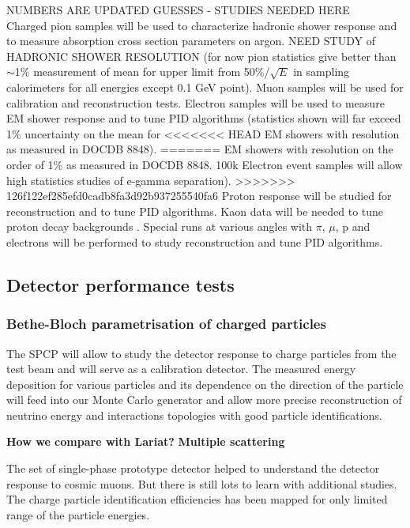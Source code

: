 NUMBERS ARE UPDATED GUESSES - STUDIES NEEDED HERE \\
Charged pion samples will be used to characterize hadronic shower response and to measure
absorption cross section parameters on argon. NEED STUDY of HADRONIC SHOWER RESOLUTION
(for now pion statistics give better than $\sim$1\% measurement of mean for upper limit from 50\%/$\sqrt{E}$ in sampling calorimeters
for all energies except 0.1 GeV point). 
Muon samples will be used for calibration and 
reconstruction tests. Electron samples will be used to measure EM shower response  
and to tune PID algorithms (statistics shown will far exceed 1\% uncertainty on the mean for 
<<<<<<< HEAD
EM showers with resolution as measured in DOCDB 8848). 
=======
EM showers with resolution on the order of 1\% as measured in DOCDB 8848. 100k Electron event samples will allow
high statistics studies of e-gamma separation).  
>>>>>>> 126f122ef285efd0cadb8fa3d92b937255540fa6
Proton response will be studied for reconstruction and to tune PID 
algorithms. Kaon data will be needed to tune proton decay backgrounds .
Special runs at various angles with $\pi$, $\mu$, p and electrons will be performed to study reconstruction and tune PID algorithms. 

\subsection{Detector performance tests}

\subsubsection{Bethe-Bloch parametrisation of charged particles}

The SPCP will allow to study the detector response to charge particles from the test beam and will serve as a calibration detector. The measured energy deposition for various particles and its dependence on the direction of the particle will feed into our Monte Carlo generator and allow more precise reconstruction of neutrino energy and interactions topologies with good particle identifications.
 
{\bf How we compare with Lariat?} 
{\bf Multiple scattering}  

The set of single-phase prototype detector helped to understand the detector response to cosmic muons. But there is still lots to learn with additional studies. 
The charge  particle identification efficiencies  has been mapped for only limited range of the particle energies.  



